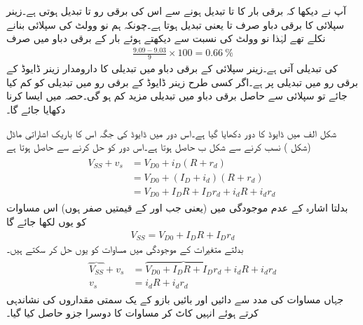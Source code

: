 آپ نے دیکھا کہ برقی بار کا  تا  تبدیل ہونے سے اس کی برقی رو  تا   تبدیل ہوتی ہے۔زینر سپلائی کا برقی دباو صرف  تا  یعنی  تبدیل ہوتا ہے۔چونکہ ہم نو وولٹ کی سپلائی بنانے نکلے تھے لہٰذا نو وولٹ کی نسبت سے دیکھتے ہوئے بار کے برقی دباو  میں صرف
\begin{align*}
\frac{9.09-9.03}{9} \times 100=\SI{0.66}{\percent}
\end{align*}
کی تبدیلی آتی ہے۔زینر سپلائی کے برقی دباو میں تبدیلی کا دارومدار زینر ڈایوڈ کے برقی رو میں تبدیلی پر ہے۔اگر کسی طرح زینر ڈایوڈ کے برقی رو میں تبدیلی کو کم کیا جائے تو سپلائی سے حاصل برقی دباو میں تبدیلی مزید کم ہو گی۔حصہ  میں ایسا کرنا دکھایا جائے گا۔

شکل  الف میں ڈایوڈ کا دور دکھایا گیا ہے۔اس دور میں ڈایوڈ کی جگہ اس کا باریک اشاراتی ماڈل (شکل 
  ) نسب کرنے سے شکل  ب حاصل ہوتا ہے۔اس دور کو حل کرنے سے حاصل ہوتا ہے
\begin{gather} \label{مساوات_ڈایوڈ_اشارہ_موجود}
\begin{aligned}
V_{SS}+v_s&=V_{D0}+i_D (R+r_d )\\
&=V_{D0}+(I_D+i_d)(R+r_d)\\
&=V_{D0}+I_D R + I_D r_d + i_d R + i_d r_d\
\end{aligned}
\end{gather}
بدلتا اشارہ کے عدم موجودگی میں (یعنی جب   اور  کے قیمتیں صفر ہوں) اس مساوات کو یوں لکھا جائے گا
\begin{align} \label{مساوات_ڈایوڈ_اشارہ_عدم_موجود}
V_{SS}=V_{D0}+I_D R +I_D r_d
\end{align}
بدلتے متغیرات کے موجودگی میں مساوات   کو یوں حل کر سکتے ہیں۔
\begin{gather} \label{مساوات_ڈایوڈ_باریک_اشاراتی_مساوات}
\begin{aligned}
\overbrace{V_{SS}}+v_s &=\overbrace{V_{D0}+I_D R + I_D r_d}+i_d R + i_d r_d\\
v_s &= i_d R + i_d r_d
\end{aligned}
\end{gather}
جہاں مساوات   کی مدد سے دائیں اور بائیں بازو کے یک سمتی مقداروں کی نشاندہی کرتے ہوئے انہیں کاٹ کر مساوات کا دوسرا جزو حاصل کیا گیا۔

